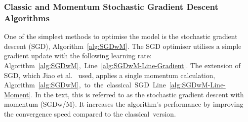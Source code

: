 %
\subsubsection{Classic and Momentum Stochastic Gradient Descent Algorithms}
One of the simplest methods to optimise the model is the stochastic gradient descent (SGD), Algorithm~\ref{alg:SGDwM}.
The SGD optimiser utilises a simple gradient update with the following learning rate: \mbox{Algorithm~\ref{alg:SGDwM}, Line~\ref{alg:SGDwM-Line-Gradient}}.
The extension of SGD, which Jiao et al.~\cite{jiao_gru-rnn_2020} used, applies a single momentum calculation, \mbox{Algorithm~\ref{alg:SGDwM}, to the classical SGD Line~\ref{alg:SGDwM-Line-Moment}}.
In the text, this is referred to as the stochastic gradient descent with momentum (SGDw/M).
It increases the algorithm's performance by improving the convergence speed compared to the classical~version.
